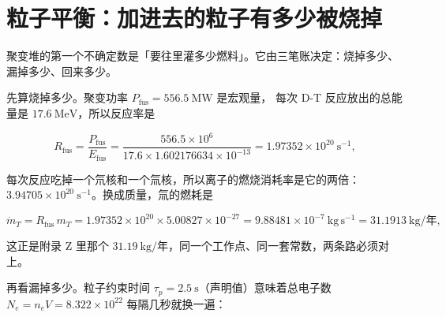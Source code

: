 
\section{粒子平衡：加进去的粒子有多少被烧掉}
\label{sec:app-aj-balance}

聚变堆的第一个不确定数是「要往里灌多少燃料」。它由三笔账决定：烧掉多少、漏掉多少、回来多少。

先算烧掉多少。聚变功率 $P_{\mathrm{fus}} = 556.5\ \mathrm{MW}$ 是宏观量，
每次 D-T 反应放出的总能量是 $17.6\ \mathrm{MeV}$，所以反应率是

\begin{equation}
R_{\mathrm{fus}} = \frac{P_{\mathrm{fus}}}{E_{\mathrm{fus}}}
= \frac{556.5\times10^{6}}{17.6\times1.602176634\times10^{-13}}
= 1.97352\times10^{20}\ \mathrm{s^{-1}},
\label{eq:app-aj-rfus}
\end{equation}

每次反应吃掉一个氘核和一个氚核，所以离子的燃烧消耗率是它的两倍：
$3.94705\times10^{20}\ \mathrm{s^{-1}}$。换成质量，氚的燃耗是

\begin{equation}
\dot m_T = R_{\mathrm{fus}}\,m_T = 1.97352\times10^{20}\times5.00827\times10^{-27}
= 9.88481\times10^{-7}\ \mathrm{kg\,s^{-1}} = 31.1913\ \text{kg/年},
\label{eq:app-aj-burn}
\end{equation}

这正是附录 Z 里那个 $31.19\ \text{kg/年}$，同一个工作点、同一套常数，两条路必须对上。

再看漏掉多少。粒子约束时间 $\tau_p = 2.5\ \mathrm{s}$（声明值）意味着总电子数
$N_e = n_eV = 8.322\times10^{22}$ 每隔几秒就换一遍：

